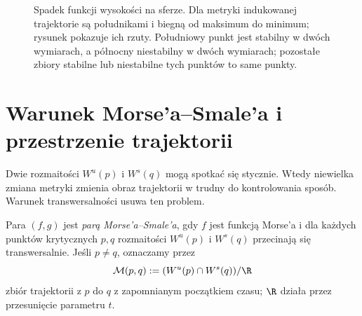 \begin{figure}[htbp]
\centering
{}
\caption{Spadek funkcji wysokości na sferze.
Dla metryki indukowanej trajektorie są południkami
i biegną od maksimum do minimum; rysunek pokazuje ich rzuty.
Południowy punkt jest stabilny w dwóch
wymiarach, a północny niestabilny w dwóch
wymiarach; pozostałe zbiory stabilne
lub niestabilne tych punktów to same punkty.}
\label{fig:przeplyw-morse-sfera-17}
\end{figure}

\section{Warunek Morse'a--Smale'a i przestrzenie trajektorii}
\label{sec:morse-smale-17}

Dwie rozmaitości $W^u(p)$ i $W^s(q)$
mogą spotkać się stycznie. Wtedy
niewielka zmiana metryki zmienia
obraz trajektorii w trudny do
kontrolowania sposób. Warunek
transwersalności usuwa ten problem.

\begin{definicja}
\label{def:ms-17}
Para $(f,g)$ jest \emph{parą Morse'a--Smale'a},
gdy $f$ jest funkcją Morse'a
i dla każdych punktów krytycznych
$p,q$ rozmaitości $W^u(p)$ i $W^s(q)$
przecinają się transwersalnie.
Jeśli $p\ne q$, oznaczamy przez
\[
 \mathcal M(p,q)
 :=(W^u(p)\cap W^s(q))/\R
\]
zbiór trajektorii z $p$ do $q$
z zapomnianym początkiem czasu;
$\R$ działa przez przesunięcie
parametru $t$.
\end{definicja}

